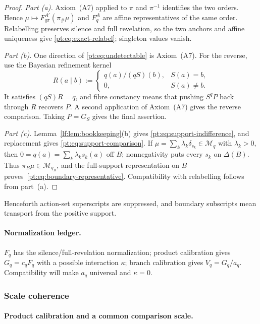 \begin{proof}
\emph{Part (a).}
Axiom~\textup{(A7)} applied to $\pi$ and $\pi^{-1}$ identifies the two
orders.  Hence $\mu\mapsto F_{q\pi}^{A'}(\pi_\#\mu)$ and $F_q^A$ are affine
representatives of the same order.  Relabelling preserves silence and full
revelation, so the two anchors and affine uniqueness give
\eqref{pt:eq:exact-relabel}; singleton values vanish.

\emph{Part (b).}
One direction of \eqref{pt:eq:undetectable} is Axiom~\textup{(A7)}.  For the
reverse, use the Bayesian refinement kernel
\[
 R(a\mid b):=
 \begin{cases}
 q(a)/(qS)(b),&S(a)=b,\\
 0,&S(a)\ne b.
 \end{cases}
\]
It satisfies $(qS)R=q$, and fibre constancy means that pushing $S^qP$ back
through $R$ recovers $P$.  A second application of Axiom~\textup{(A7)} gives
the reverse comparison.  Taking $P=G_S$ gives the final assertion.

\emph{Part (c).}
Lemma~\ref{lf:lem:bookkeeping}\textup{(b)} gives
\eqref{pt:eq:support-indifference}, and replacement gives
\eqref{pt:eq:support-comparison}.  If
$\mu=\sum_k\lambda_k\delta_{s_k}\in\mathcal M_q$ with $\lambda_k>0$, then
$0=q(a)=\sum_k\lambda_ks_k(a)$ off $B$; nonnegativity puts every $s_k$ on
$\Delta(B)$.  Thus $\pi_B\mu\in\mathcal M_{q_B}$, and the full-support
representation on $B$ proves~\eqref{pt:eq:boundary-representative}.
Compatibility with relabelling follows from part~\textup{(a)}.
\end{proof}

Henceforth action-set superscripts are suppressed, and boundary subscripts
mean transport from the positive support.

\paragraph{Normalization ledger.}
$F_q$ has the silence/full-revelation normalization; product calibration gives
$G_q=c_qF_q$ with a possible interaction $\kappa$; branch calibration gives
$V_q=G_q/a_q$.  Compatibility will make $a_q$ universal and $\kappa=0$.

\subsubsection{Scale coherence}

\paragraph{Product calibration and a common comparison scale.}

